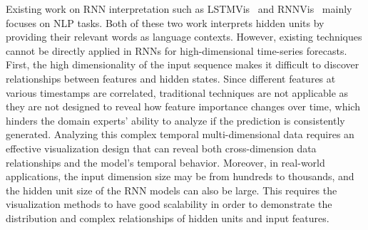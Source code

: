 


Existing work on RNN interpretation such as LSTMVis~\cite{strobelt2018lstmvis} and RNNVis~\cite{ming2017understanding} mainly focuses on NLP tasks. 
Both of these two work interprets hidden units by providing their relevant words as language contexts.
However, existing techniques cannot be directly applied in RNNs for high-dimensional time-series forecasts.
First, the high dimensionality of the input sequence makes it difficult to discover relationships between features and hidden states. 
Since different features at various timestamps are correlated, traditional techniques are not applicable as they are not designed to reveal how feature importance changes over time, which hinders the domain experts' ability to analyze if the prediction is consistently generated.
Analyzing this complex temporal multi-dimensional data requires an effective visualization design that can reveal both cross-dimension data relationships and the model's temporal behavior.
Moreover, in real-world applications, the input dimension size may be from hundreds to thousands, and the hidden unit size of the RNN models can also be large.
This requires the visualization methods to have good scalability in order to demonstrate the distribution and complex relationships of hidden units and input features.

